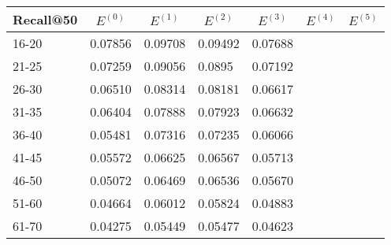 \begin{table*}[]
    \centering
    \begin{tabular}{|l|l|l|l|l|l|l|}
        \hline
        Recall@50 & \multicolumn{1}{c|}{$E^{(0)}$} & \multicolumn{1}{c|}{$E^{(1)}$} & \multicolumn{1}{c|}{$E^{(2)}$} & \multicolumn{1}{c|}{$E^{(3)}$} & \multicolumn{1}{c|}{$E^{(4)}$} & \multicolumn{1}{c|}{$E^{(5)}$} \\ \hline
        16-20     & 0.07856                        & 0.09708                        & 0.09492                        & 0.07688                        &                                &                                \\ \hline
        21-25     & 0.07259                        & 0.09056                        & 0.0895                         & 0.07192                        &                                &                                \\ \hline
        26-30     & 0.06510                        & 0.08314                        & 0.08181                        & 0.06617                        &                                &                                \\ \hline
        31-35     & 0.06404                        & 0.07888                        & 0.07923                        & 0.06632                        &                                &                                \\ \hline
        36-40     & 0.05481                        & 0.07316                        & 0.07235                        & 0.06066                        &                                &                                \\ \hline
        41-45     & 0.05572                        & 0.06625                        & 0.06567                        & 0.05713                        &                                &                                \\ \hline
        46-50     & 0.05072                        & 0.06469                        & 0.06536                        & 0.05670                        &                                &                                \\ \hline
        51-60     & 0.04664                        & 0.06012                        & 0.05824                        & 0.04883                        &                                &                                \\ \hline
        61-70     & 0.04275                        & 0.05449                        & 0.05477                        & 0.04623                        &                                &                                \\ \hline

\end{tabular}
\end{table*}
